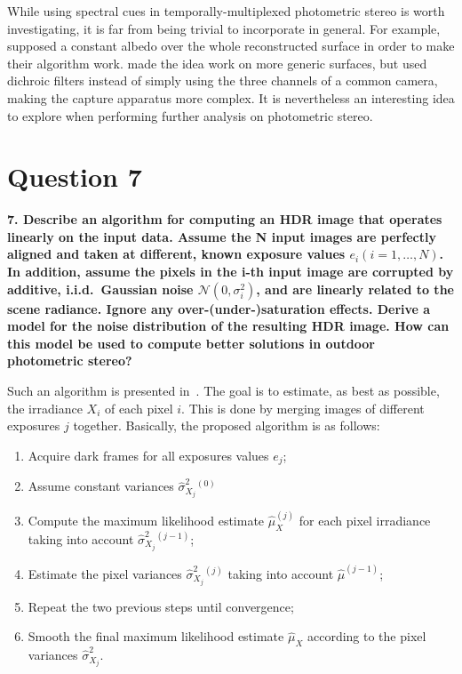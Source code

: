 \documentclass{report}
\begin{document}
While using spectral cues in temporally-multiplexed photometric stereo is worth investigating, it is far from being trivial to incorporate in general. For example, \cite{johnson-cvpr-11} supposed a constant albedo over the whole reconstructed surface in order to make their algorithm work. \cite{Fyffe2011} made the idea work on more generic surfaces, but used dichroic filters instead of simply using the three channels of a common camera, making the capture apparatus more complex. It is nevertheless an interesting idea to explore when performing further analysis on photometric stereo.

\section{Question 7}
\textbf{7. Describe an algorithm for computing an HDR image that operates linearly on the input data.
Assume the N input images are perfectly aligned and taken at different, known exposure values $e_i (i = 1, \dots , N )$. In addition, assume the pixels in the i-th input image are corrupted by additive, i.i.d.\ Gaussian noise $\mathcal{N} (0, \sigma_i^2)$, and are linearly related to the scene radiance. Ignore any over-(under-)saturation effects. Derive a model for the noise distribution of the resulting HDR image. How can this model be used to compute better solutions in outdoor photometric stereo?}

Such an algorithm is presented in~\cite{Granados2010a}. The goal is to estimate, as best as possible, the irradiance $X_i$ of each pixel $i$. This is done by merging images of different exposures $j$ together. Basically, the proposed algorithm is as follows:
\begin{enumerate}
  \item{Acquire dark frames for all exposures values $e_j$;}
  \item{Assume constant variances $\hat{\sigma}_{X_j}^2{}^{(0)}$}
  \item{Compute the maximum likelihood estimate $\hat{\mu}_X^{(j)}$ for each pixel irradiance taking into account $\hat{\sigma}_{X_j}^2{}^{(j-1)}$;}
  \item{Estimate the pixel variances $\hat{\sigma}_{X_j}^2{}^{(j)}$ taking into account $\hat{\mu}^{(j-1)}$;}
  \item{Repeat the two previous steps until convergence;}
  \item{Smooth the final maximum likelihood estimate $\hat{\mu}_X$ according to the pixel variances $\hat{\sigma}_{X_j}^2$}.
\end{enumerate}
\end{document}
